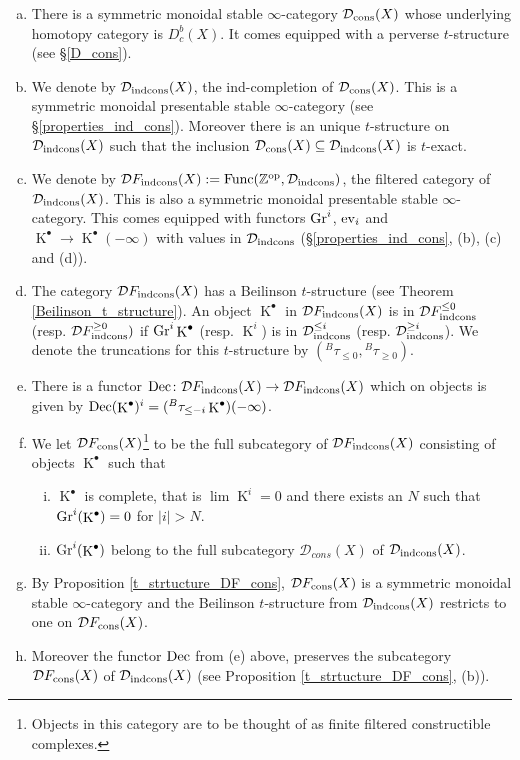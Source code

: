 \documentclass[12pt, reqno]{amsart}
\theoremstyle{plain}
\theoremstyle{definition}
\theoremstyle{definition}
\newcommand{\bbZ}{{\mathbb Z}}
\newcommand{\cD}{{\mathcal D}}
\DeclareMathOperator{\KK}{K}
\begin{document}
\begin{enumerate}[(a)]
    \item  There is a symmetric monoidal stable $\infty$-category $\cD_{\textup{cons}}(X)$ whose underlying homotopy category is $D^b_c(X)$. It comes equipped with a perverse $t$-structure (see \S \ref{D_cons}). 
    \item We denote by $\cD_{\textup{indcons}}(X)$, the ind-completion of $\cD_{\textup{cons}}(X)$. This is a symmetric monoidal presentable stable $\infty$-category (see \S \ref{properties_ind_cons}). Moreover there is an unique $t$-structure on $\cD_{\textup{indcons}}(X)$ such that the inclusion $\cD_{\textup{cons}}(X) \subseteq \cD_{\textup{indcons}}(X)$ is $t$-exact. 
    \item We denote by $\cD F_{\textup{indcons}}(X) :=\textup{Func}(\bbZ^{\textup{op}},\cD_{\textup{indcons}})$, the filtered category of $\cD_{\textup{indcons}}(X)$. This is also a symmetric monoidal presentable stable $\infty$-category. This comes equipped with functors $\textup{Gr}^i$, $\textup{ev}_i$ and $\KK^{\bullet} \to \KK^{\bullet}(-\infty)$ with values in $\cD_{\textup{indcons}}$ (\S \ref{properties_ind_cons}, (b), (c) and (d)).
    \item The category $\cD F_{\textup{indcons}}(X)$ has a Beilinson $t$-structure (see Theorem \ref{Beilinson_t_structure}). An object $\KK^{\bullet}$ in $\cD F_{\textup{indcons}}(X)$ is in $\cD F_{\textup{indcons}}^{\leq 0}$ (resp. $\cD F_{\textup{indcons}}^{\geq 0})$ if $\textup{Gr}^i\KK^{\bullet}$ (resp. $\KK^i$) is in $\cD^{\leq i}_{\textup{indcons}}$ (resp. $\cD^{\geq i}_{\textup{indcons}}$). We denote the truncations for this $t$-structure by $(^{B}\tau_{\leq 0},{}^{B}\tau_{\geq 0})$. 
    \item There is a functor $\textup{Dec} \colon \cD F_{\textup{indcons}}(X) \to \cD F_{\textup{indcons}}(X)$ which on objects is given by $\textup{Dec}(\KK^{\bullet})^{i}=({}^B\tau_{\leq -i}\KK^{\bullet})(-\infty)$.
    \item We let $\cD F_{\textup{cons}}(X)$\footnote{Objects in this category are to be thought of as finite filtered constructible complexes.} to be the full subcategory of $\cD F_{\textup{indcons}}(X)$ consisting of objects $\KK^{\bullet}$ such that
\begin{enumerate}[(i)]
    \item $\KK^{\bullet}$ is complete, that is $\lim \KK^i=0$ and there exists an $N$ such that $\textup{Gr}^{i}(\KK^{\bullet})=0$ for $|i|>N$.
    \item $\textup{Gr}^{i}(\KK^{\bullet})$ belong to the full subcategory $\cD_{cons}(X)$ of $\cD_{\textup{indcons}}(X)$.
\end{enumerate}
    \item By Proposition \ref{t_strtucture_DF_cons}, $\cD F_{\textup{cons}}(X)$ is a symmetric monoidal stable $\infty$-category and the Beilinson $t$-structure from $\cD_{\textup{indcons}}(X)$ restricts to one on $\cD F_{\textup{cons}}(X)$.
    \item Moreover the functor $\textup{Dec}$ from (e) above, preserves the subcategory $\cD F_{\textup{cons}}(X)$ of  $\cD_{\textup{indcons}}(X)$ (see Proposition \ref{t_strtucture_DF_cons}, (b)).
    

\end{enumerate}
\end{document}
